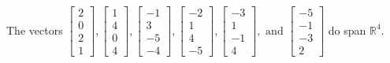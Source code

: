 \begin{exercise}
\begin{exerciseStatement}
  \end{exerciseStatement}
  \begin{exerciseAnswer}
   The vectors \(\left[\begin{array}{r}
2 \\
0 \\
2 \\
1
\end{array}\right] , \left[\begin{array}{r}
1 \\
4 \\
0 \\
4
\end{array}\right] , \left[\begin{array}{r}
-1 \\
3 \\
-5 \\
-4
\end{array}\right] , \left[\begin{array}{r}
-2 \\
1 \\
4 \\
-5
\end{array}\right] , \left[\begin{array}{r}
-3 \\
1 \\
-1 \\
4
\end{array}\right] , \text{ and } \left[\begin{array}{r}
-5 \\
-1 \\
-3 \\
2
\end{array}\right]\) 
  	 do  
	span \(\mathbb{R}^4\).
  


  \end{exerciseAnswer}
\end{exercise}